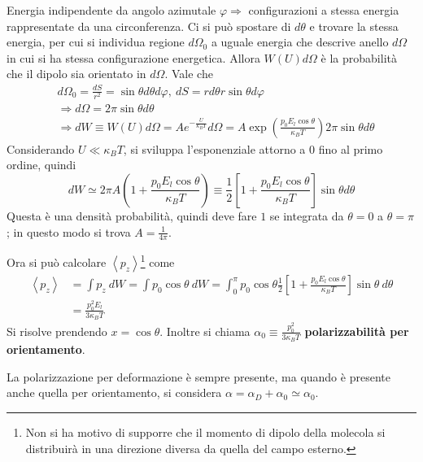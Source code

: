 \documentclass[10pt, a4paper]{scrartcl}
\numberwithin{equation}{subsection}
\theoremstyle{style1}
\begin{document}
Energia indipendente da angolo azimutale $\varphi \Rightarrow $ configurazioni a stessa energia rappresentate da una circonferenza. Ci si pu\`o spostare di $d\theta $ e trovare la stessa energia, per cui si individua regione $d\Omega_0$ a uguale energia che descrive anello $d\Omega $ in cui si ha stessa configurazione energetica. Allora $W(U) d\Omega $ \`e la probabilit\`a che il dipolo sia orientato in $d\Omega$. Vale che
\begin{equation}
	\begin{split}
		&d\Omega_0 = \frac{dS}{r^2}=\sin \theta  d\theta  d\varphi, \ dS = r d\theta  r \sin \theta  d\varphi \\
		&\Rightarrow d\Omega = 2 \pi \sin \theta  d\theta \\
		&\Rightarrow dW \equiv W(U) d\Omega = Ae^{- \frac{U}{\kappa _B T}}  d\Omega =A\exp \left(\frac{p_0 E_l \cos \theta }{\kappa _B T}\right) 2\pi\sin \theta  d\theta  
	\end{split}
\end{equation}
Considerando $U \ll \kappa _B T$, si sviluppa l'esponenziale attorno a $0$ fino al primo ordine, quindi
\begin{equation}
	dW \simeq 2\pi A \left(1+ \frac{p_0 E_l \cos \theta }{\kappa _B T}\right) \equiv \frac{1}{2}\left[ 1+ \frac{p_0 E_l \cos \theta }{\kappa _B T} \right] \sin \theta  d\theta 
\end{equation}
Questa \`e una densit\`a probabilit\`a, quindi deve fare $1$ se integrata da $\theta =0$ a $\theta =\pi$; in questo modo si trova $A = \frac{1}{4 \pi}$.

Ora si pu\`o calcolare $\left\langle p_z \right\rangle$\footnote{Non si ha motivo di supporre che il momento di dipolo della molecola si distribuir\`a in una direzione diversa da quella del campo esterno.} come
\begin{equation}
	\begin{split}
		\left\langle p_z \right\rangle &= \int p_z\ dW = \int p_0\cos \theta\  dW = \int_{0} ^\pi p_0 \cos \theta  \frac{1}{2}\left[ 1+ \frac{p_0 E_l \cos \theta }{\kappa _B T} \right] \sin \theta  \ d \theta \\
					       &= \frac{p_0^2 E_l }{3\kappa _B T}
	\end{split}
\end{equation}
Si risolve prendendo $x=\cos \theta $. Inoltre si chiama $\alpha _0 \equiv \frac{p_0^2}{3\kappa _B T}$ \textbf{polarizzabilit\`a per orientamento}. 

La polarizzazione per deformazione \`e sempre presente, ma quando \`e presente anche quella per orientamento, si considera $\alpha  = \alpha _D + \alpha_0 \simeq \alpha _0$.
\end{document}
